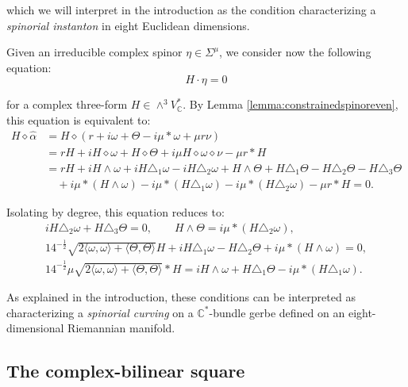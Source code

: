 \documentclass[10pt,a4paper,twoside,reqno]{amsart}
\theoremstyle{plain}
\theoremstyle{definition}
\theoremstyle{remark}
\def\C{\mathbb{C}}
\newcommand{\escal}[1]{\langle#1\rangle}
\begin{document}
\noindent
which we will interpret in the introduction as the condition characterizing a \emph{spinorial instanton} in eight Euclidean dimensions.\medskip

Given an irreducible complex spinor $\eta\in \Sigma^{\mu}$, we consider now the following equation:
\begin{equation*}
H \cdot \eta = 0
\end{equation*}

\noindent
for a complex three-form $H\in \wedge^3 V^{\ast}_{\C}$. By Lemma \ref{lemma:constrainedspinoreven}, this equation is equivalent to:
\begin{align*}
H \diamond \widehat{\alpha} & = H \diamond (r+i\omega+\Theta-i\mu*\omega+\mu r\nu )\\
& = r H + i H \diamond \omega + H \diamond \Theta + i\mu H \diamond \omega\diamond \nu - \mu r \ast H\\
& = r H + i H\wedge \omega +  i H \triangle_1 \omega - i H \triangle_2 \omega + H \wedge \Theta + H \triangle_1 \Theta - H\triangle_2 \Theta - H \triangle_3 \Theta \\
&\quad  + i \mu \ast (H\wedge \omega) - i \mu \ast ( H \triangle_1 \omega ) - i \mu \ast ( H \triangle_2 \omega) - \mu r\ast H = 0.
\end{align*}

\noindent
Isolating by degree, this equation reduces to:
\begin{equation}
\label{eq:algebraicH8d}
\begin{gathered}
i H \triangle_2 \omega + H \triangle_3 \Theta = 0,\qquad H \wedge \Theta   = i \mu \ast ( H \triangle_2 \omega),\\
14^{-\frac{1}{2}}\sqrt{ 2\escal{\omega,\omega}+\escal{\Theta,\Theta}} H +  i H \triangle_1 \omega    - H\triangle_2 \Theta   + i \mu \ast (H\wedge \omega) = 0,\\
14^{-\frac{1}{2}} \mu \sqrt{ 2\escal{\omega,\omega}+\escal{\Theta,\Theta}} \ast H = i H\wedge \omega + H \triangle_1 \Theta - i \mu \ast ( H \triangle_1 \omega ).
\end{gathered}
\end{equation}

\noindent
As explained in the introduction, these conditions can be interpreted as characterizing a \emph{spinorial curving} on a $\C^{\ast}$-bundle gerbe defined on an eight-dimensional Riemannian manifold.


\subsection{The complex-bilinear square}
\end{document}
